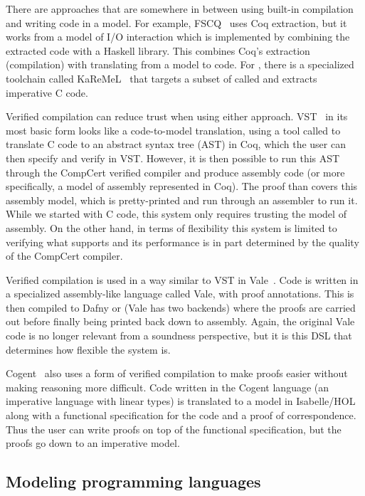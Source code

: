 There are approaches that are somewhere in between using built-in compilation
and writing code in a model. For example, FSCQ~\cite{chen:fscq} uses Coq
extraction, but it works from a model of I/O interaction which is implemented by
combining the extracted code with a Haskell library. This combines Coq's
extraction (compilation) with translating from a model to code. For \fstar,
there is a specialized toolchain called KaReMeL~\cite{protzenko:lowstar} that
targets a subset of \fstar called \lowstar and extracts imperative C code.

Verified compilation can reduce trust when using either approach.
VST~\cite{cao:vst-floyd} in its most basic form looks like a code-to-model
translation, using a tool called  to translate C code to an
abstract syntax tree (AST) in Coq, which the user can then specify and verify in
VST. However, it is then possible to run this AST through the CompCert verified
compiler and produce assembly code (or more specifically, a model of assembly
represented in Coq). The proof than covers this assembly model, which is
pretty-printed and run through an assembler to run it. While we started with C
code, this system only requires trusting the model of assembly. On the other
hand, in terms of flexibility this system is limited to verifying what
 supports and its performance is in part determined by the quality
of the CompCert compiler.

Verified compilation is used in a way similar to VST in
Vale~\cite{bond:vale,fromherz:vale-fstar}. Code is written in a specialized
assembly-like language called Vale, with proof annotations. This is then
compiled to Dafny or \fstar (Vale has two backends) where the proofs are carried
out before finally being printed back down to assembly. Again, the original Vale
code is no longer relevant from a soundness perspective, but it is this DSL that
determines how flexible the system is.

Cogent~\cite{amani:cogent,oconnor:cogent-lang} also uses a form of verified
compilation to make proofs easier without making reasoning more difficult. Code
written in the Cogent language (an imperative language with linear types) is
translated to a model in Isabelle/HOL along with a functional specification for
the code and a proof of correspondence. Thus the user can write proofs on top of
the functional specification, but the proofs go down to an imperative model.

\subsection{Modeling programming languages}

